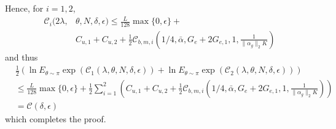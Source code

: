 \documentclass{article}
\begin{document}
       Hence,  for $i=1,2$,
       \begin{align*}
            \mathcal{C}_i(2\lambda, & \theta,N,\delta,\epsilon) \le \frac{L}{128} \max\{0,\epsilon\} + \\
               & C_{u,1}+C_{u,2}+\frac{1}{2}\mathcal{C}_{b,m,i}\left(1/4, \bar{\alpha}, G_e+2G_{e,1}, 1, \frac{1}{\|\alpha_g\|_2K}\right)
       \end{align*}
       and thus 
      \begin{align*}
          & \frac{1}{2} \left(   \ln E_{\theta \sim \pi} \exp(\mathcal{C}_1(\lambda,\theta,N,\delta,\epsilon)) +
           \ln E_{\theta \sim \pi} \exp(\mathcal{C}_2(\lambda,\theta,N,\delta,\epsilon)) 
          \right)  \\
          & \le \frac{L}{128} \max\{0,\epsilon\} + \frac{1}{2} \sum_{i=1}^{2} \left(C_{u,1}+C_{u,2}+ \frac{1}{2}\mathcal{C}_{b,m,i}\left(1/4, \bar{\alpha}, G_e+2G_{e,1}, 1, \frac{1}{\|\alpha_g\|_2K}\right)\right)  \\
          & = \mathcal{C}(\delta,\epsilon)
      \end{align*}
   which completes the proof. 
\end{document}
